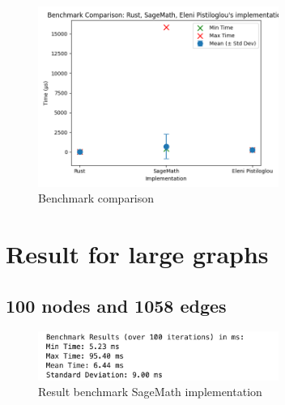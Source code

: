 \begin{figure}[!h]
    \centering
    \includegraphics[width=0.70\textwidth]{images/benchmark/digraph/benchmark_comparison_digraph}
    \caption{Benchmark comparison}
    \label{fig:benchmark-comparison-digraph}
\end{figure}


\newpage


\section{Result for large graphs}\label{sec:result-for-large-graphs}

\subsection{100 nodes and 1058 edges}\label{subsec:result-for-graphs-100-1058}

\begin{figure}[!h]
    \centering
    \includegraphics[width=0.70\textwidth]{images/benchmark/large_graph/benchmark_large_graph_sagemath}
    \caption{Result benchmark SageMath implementation}
    \label{fig:benchmark-large-graph-sagemath}
\end{figure}


